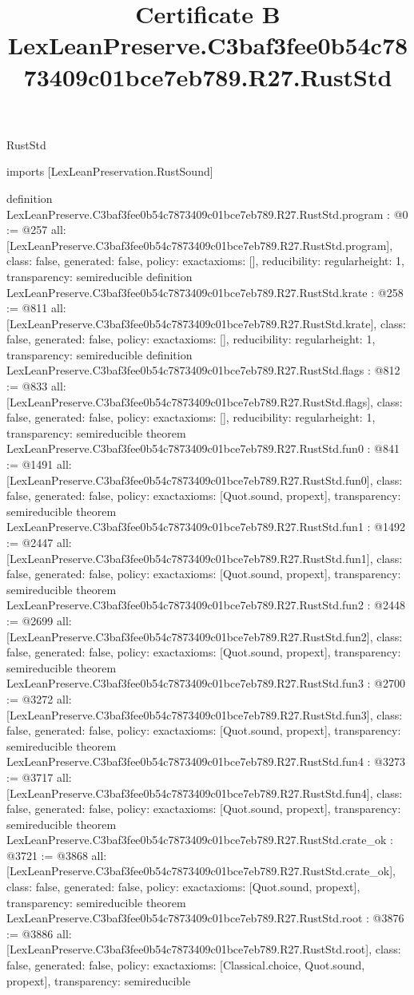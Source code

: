 \begin{lexlean}{RustStd}
\title{Certificate B LexLeanPreserve.C3baf3fee0b54c7873409c01bce7eb789.R27.RustStd}
\begin{coremodule}
imports [LexLeanPreservation.RustSound]

definition LexLeanPreserve.C3baf3fee0b54c7873409c01bce7eb789.R27.RustStd.program : @0 := @257 {
  all: [LexLeanPreserve.C3baf3fee0b54c7873409c01bce7eb789.R27.RustStd.program],
  class: false,
  generated: false,
  policy: exact{axioms: []},
  reducibility: regular{height: 1},
  transparency: semireducible
}
definition LexLeanPreserve.C3baf3fee0b54c7873409c01bce7eb789.R27.RustStd.krate : @258 := @811 {
  all: [LexLeanPreserve.C3baf3fee0b54c7873409c01bce7eb789.R27.RustStd.krate],
  class: false,
  generated: false,
  policy: exact{axioms: []},
  reducibility: regular{height: 1},
  transparency: semireducible
}
definition LexLeanPreserve.C3baf3fee0b54c7873409c01bce7eb789.R27.RustStd.flags : @812 := @833 {
  all: [LexLeanPreserve.C3baf3fee0b54c7873409c01bce7eb789.R27.RustStd.flags],
  class: false,
  generated: false,
  policy: exact{axioms: []},
  reducibility: regular{height: 1},
  transparency: semireducible
}
theorem LexLeanPreserve.C3baf3fee0b54c7873409c01bce7eb789.R27.RustStd.fun0 : @841 := @1491 {
  all: [LexLeanPreserve.C3baf3fee0b54c7873409c01bce7eb789.R27.RustStd.fun0],
  class: false,
  generated: false,
  policy: exact{axioms: [Quot.sound, propext]},
  transparency: semireducible
}
theorem LexLeanPreserve.C3baf3fee0b54c7873409c01bce7eb789.R27.RustStd.fun1 : @1492 := @2447 {
  all: [LexLeanPreserve.C3baf3fee0b54c7873409c01bce7eb789.R27.RustStd.fun1],
  class: false,
  generated: false,
  policy: exact{axioms: [Quot.sound, propext]},
  transparency: semireducible
}
theorem LexLeanPreserve.C3baf3fee0b54c7873409c01bce7eb789.R27.RustStd.fun2 : @2448 := @2699 {
  all: [LexLeanPreserve.C3baf3fee0b54c7873409c01bce7eb789.R27.RustStd.fun2],
  class: false,
  generated: false,
  policy: exact{axioms: [Quot.sound, propext]},
  transparency: semireducible
}
theorem LexLeanPreserve.C3baf3fee0b54c7873409c01bce7eb789.R27.RustStd.fun3 : @2700 := @3272 {
  all: [LexLeanPreserve.C3baf3fee0b54c7873409c01bce7eb789.R27.RustStd.fun3],
  class: false,
  generated: false,
  policy: exact{axioms: [Quot.sound, propext]},
  transparency: semireducible
}
theorem LexLeanPreserve.C3baf3fee0b54c7873409c01bce7eb789.R27.RustStd.fun4 : @3273 := @3717 {
  all: [LexLeanPreserve.C3baf3fee0b54c7873409c01bce7eb789.R27.RustStd.fun4],
  class: false,
  generated: false,
  policy: exact{axioms: [Quot.sound, propext]},
  transparency: semireducible
}
theorem LexLeanPreserve.C3baf3fee0b54c7873409c01bce7eb789.R27.RustStd.crate_ok : @3721 := @3868 {
  all: [LexLeanPreserve.C3baf3fee0b54c7873409c01bce7eb789.R27.RustStd.crate_ok],
  class: false,
  generated: false,
  policy: exact{axioms: [Quot.sound, propext]},
  transparency: semireducible
}
theorem LexLeanPreserve.C3baf3fee0b54c7873409c01bce7eb789.R27.RustStd.root : @3876 := @3886 {
  all: [LexLeanPreserve.C3baf3fee0b54c7873409c01bce7eb789.R27.RustStd.root],
  class: false,
  generated: false,
  policy: exact{axioms: [Classical.choice, Quot.sound, propext]},
  transparency: semireducible
}


\end{coremodule}
\end{lexlean}
